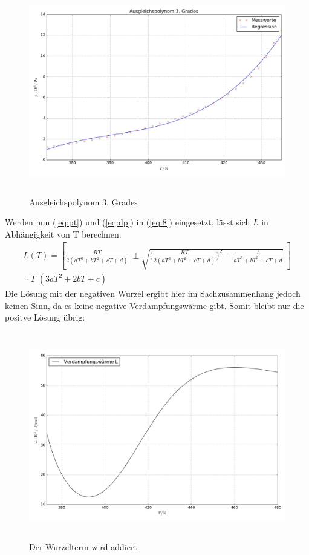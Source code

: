 
\begin{figure}[H] %
  \centering
  \includegraphics[height=9cm, width=13cm]{15bar.jpg}
  \caption{Ausgleichspolynom 3. Grades}
  \label{fig:15}
\end{figure}

Werden nun (\ref{eq:pt}) und (\ref{eq:dp}) in (\ref{eq:8}) eingesetzt, lässt sich
$L$ in Abhängigkeit von T berechnen:
\begin{align*}
  L(T) = \left[\frac{RT}{2 (aT^3+bT^2+cT+d)} \; \pm \sqrt{\biggl(\frac{RT}{2(aT^3+bT^2+cT+d)}\biggr)^2
  -\frac{A}{aT^3+bT^2+cT+d}}\; \right] \\
  \;\cdot T \; (3aT^2+2bT+c)
\end{align*}
Die Lösung mit der negativen Wurzel ergibt hier im Sachzusammenhang jedoch keinen Sinn,
da es keine negative Verdampfungswärme gibt. Somit bleibt nur die positve Lösung übrig:
\begin{figure}[H]
  \centering
  \includegraphics[height=9cm, width=13cm]{Lplus.jpg}
  \caption{Der Wurzelterm wird addiert}
  \label{fig:plus}
\end{figure}

